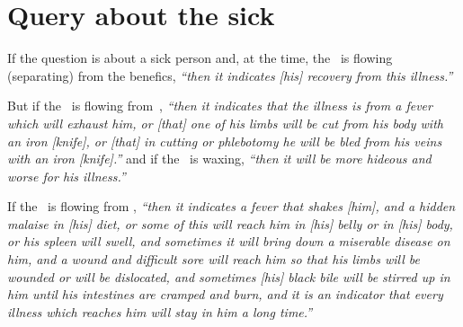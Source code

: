 \section{Query about the sick}

If the question is about a sick person and, at the time, the \Moon\, is flowing (separating) from the benefics, \textsl{``then it indicates [his] recovery from this illness.''}

But if the \Moon\, is flowing from \Mars\,, \textsl{``then it indicates that the illness is from a fever which will exhaust him, or [that] one of his limbs will be cut from his body with an iron [knife], or [that] in cutting or phlebotomy he will be bled from his veins with an iron [knife].''} and if the \Moon\, is waxing, \textsl{``then it will be more hideous and worse for his illness.''}

If the \Moon\, is flowing from \Saturn, \textsl{``then it indicates a fever that shakes [him], and a hidden malaise in [his] diet, or some of this will reach him in [his] belly or in [his] body, or his spleen will swell, and sometimes it will bring down a miserable disease on him, and a wound and difficult sore will reach him so that his limbs will be wounded or will be dislocated, and sometimes [his] black bile will be stirred up in him until his intestines are cramped and burn, and it is an indicator that every illness which reaches him will stay in him a long time.''}

